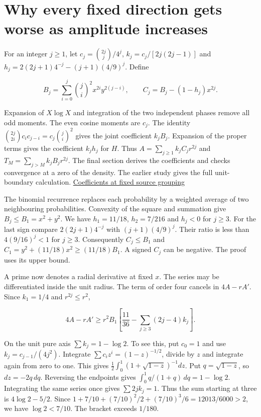\clearpage

\section{Why every fixed direction gets worse as amplitude increases}\label{why-every-fixed-direction-gets-worse-as-amplitude-increases}

For an integer \(j\ge1\), let \(c_j=\binom{2j}{j}/4^j\), \(k_j=c_j/[2j(2j-1)]\) and \(h_j=2(2j+1)4^{-j}-(j+1)(4/9)^j\). Define

\[
B_j=\sum_{i=0}^j\binom ji^2 x^{2i}y^{2(j-i)},\qquad C_j=B_j-(1-h_j)x^{2j}.
\]

Expansion of \(X\log X\) and integration of the two independent phases remove all odd moments. The even cosine moments are \(c_j\). The identity \(\binom{2j}{2i}c_i c_{j-i}=c_j\binom ji^2\) gives the joint coefficient \(k_jB_j\). Expansion of the proper terms gives the coefficient \(k_jh_j\) for \(H\). Thus \(A=\sum_{j\ge1}k_j C_jr^{2j}\) and \(T_M=\sum_{j>M}k_jB_jr^{2j}\). The final section derives the coefficients and checks convergence at a zero of the density. The earlier study gives the full unit-boundary calculation. \href{https://github.com/sepahead/pid-rs/blob/a6680cb824a3e1774cff06f9b6e4d1e8ec584056/audit/research/angular-unit-boundary/EXPOSITION.md}{Coefficients at fixed source grouping}

The binomial recurrence replaces each probability by a weighted average of two neighbouring probabilities. Convexity of the square and summation give \(B_j\le B_1=x^2+y^2\). We have \(h_1=11/18\), \(h_2=7/216\) and \(h_j<0\) for \(j\ge3\). For the last sign compare \(2(2j+1)4^{-j}\) with \((j+1)(4/9)^j\). Their ratio is less than \(4(9/16)^j<1\) for \(j\ge3\). Consequently \(C_j\le B_1\) and \(C_1=y^2+(11/18)x^2\ge(11/18)B_1\). A signed \(C_j\) can be negative. The proof uses its upper bound.

A prime now denotes a radial derivative at fixed \(x\). The series may be differentiated inside the unit radius. The term of order four cancels in \(4A-rA'\). Since \(k_1=1/4\) and \(r^{2j}\le r^2\),

\[
4A-rA'\ge r^2 B_1\left[\frac{11}{36}-\sum_{j\ge3}(2j-4)k_j\right].
\]

On the unit pure axis \(\sum k_j=1-\log 2\). To see this, put \(c_0=1\) and use \(k_j=c_{j-1}/(4j^2)\). Integrate \(\sum c_i z^i=(1-z)^{-1/2}\), divide by \(z\) and integrate again from zero to one. This gives \(\tfrac12\int_0^1(1+\sqrt{1-z})^{-1}dz\). Put \(q=\sqrt{1-z}\), so \(dz=-2q\,dq\). Reversing the endpoints gives \(\int_0^1 q/(1+q)\,dq=1-\log2\). Integrating the same series once gives \(\sum 2j k_j=1\). Thus the sum starting at three is \(4\log2-5/2\). Since \(1+7/10+(7/10)^2/2+(7/10)^3/6=12013/6000>2\), we have \(\log2<7/10\). The bracket exceeds \(1/180\).

